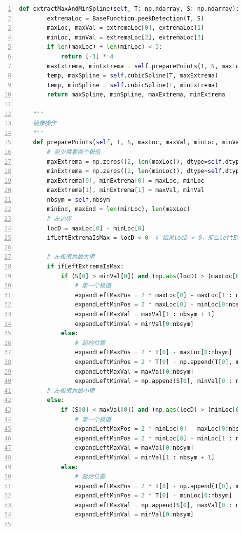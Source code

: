 \documentclass[cs4size,a4paper]{ctexart}
\numberwithin{equation}{section}
\numberwithin{table}{section}
\numberwithin{figure}{section}
\begin{document}
\begin{lstlisting}[language={python},
numbers=left,
numberstyle=\tiny\monaco,
basicstyle=\footnotesize\monaco]
    def extractMaxAndMinSpline(self, T: np.ndarray, S: np.ndarray):
        extremaLoc = BaseFunction.peekDetection(T, S)
        maxLoc, maxVal = extremaLoc[0], extremaLoc[1]
        minLoc, minVal = extremaLoc[2], extremaLoc[3]
        if len(maxLoc) + len(minLoc) < 3:
            return [-1] * 4
        maxExtrema, minExtrema = self.preparePoints(T, S, maxLoc, maxVal, minLoc, minVal)
        temp, maxSpline = self.cubicSpline(T, maxExtrema)
        temp, minSpline = self.cubicSpline(T, minExtrema)
        return maxSpline, minSpline, maxExtrema, minExtrema

    """
    镜像操作
    """
    def preparePoints(self, T, S, maxLoc, maxVal, minLoc, minVal):
        # 至少需要两个极值
        maxExtrema = np.zeros((2, len(maxLoc)), dtype=self.dtype)
        minExtrema = np.zeros((2, len(minLoc)), dtype=self.dtype)
        maxExtrema[0], minExtrema[0] = maxLoc, minLoc
        maxExtrema[1], minExtrema[1] = maxVal, minVal
        nbsym = self.nbsym
        minEnd, maxEnd = len(minLoc), len(maxLoc)
        # 左边界
        locD = maxLoc[0] - minLoc[0]
        ifLeftExtremaIsMax = locD < 0  # 如果locD < 0，那么leftExtremaMaxType就为True，就说明为左极值最大值；否则为最小值

        # 左极值为最大值
        if ifLeftExtremaIsMax:
            if (S[0] > minVal[0]) and (np.abs(locD) > (maxLoc[0] - T[0])):
                # 第一个极值
                expandLeftMaxPos = 2 * maxLoc[0] - maxLoc[1 : nbsym + 1]
                expandLeftMinPos = 2 * maxLoc[0] - minLoc[0:nbsym]
                expandLeftMaxVal = maxVal[1 : nbsym + 1]
                expandLeftMinVal = minVal[0:nbsym]
            else:
                # 起始位置
                expandLeftMaxPos = 2 * T[0] - maxLoc[0:nbsym]
                expandLeftMinPos = 2 * T[0] - np.append(T[0], minLoc[0 : nbsym - 1])
                expandLeftMaxVal = maxVal[0:nbsym]
                expandLeftMinVal = np.append(S[0], minVal[0 : nbsym - 1])
        # 左极值为最小值
        else:
            if (S[0] < maxVal[0]) and (np.abs(locD) > (minLoc[0] - T[0])):
                # 第一个极值
                expandLeftMaxPos = 2 * minLoc[0] - maxLoc[0:nbsym]
                expandLeftMinPos = 2 * minLoc[0] - minLoc[1 : nbsym + 1]
                expandLeftMaxVal = maxVal[0:nbsym]
                expandLeftMinVal = minVal[1 : nbsym + 1]
            else:
                # 起始位置
                expandLeftMaxPos = 2 * T[0] - np.append(T[0], maxLoc[0 : nbsym - 1])
                expandLeftMinPos = 2 * T[0] - minLoc[0:nbsym]
                expandLeftMaxVal = np.append(S[0], maxVal[0 : nbsym - 1])
                expandLeftMinVal = minVal[0:nbsym]


\end{lstlisting}
\end{document}
